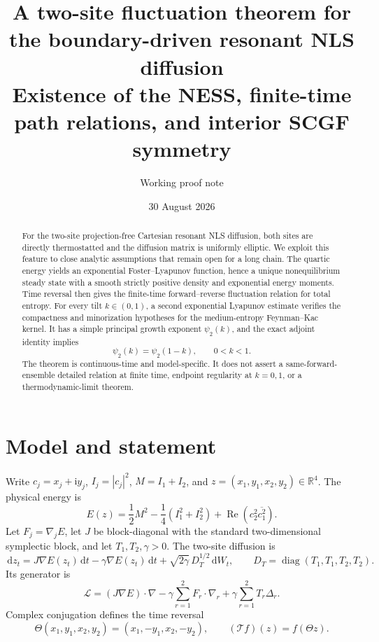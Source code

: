 \documentclass[11pt]{article}
\title{A two-site fluctuation theorem for the boundary-driven resonant NLS diffusion\\
\large Existence of the NESS, finite-time path relations, and interior SCGF symmetry}
\author{Working proof note}
\date{30 August 2026}
\theoremstyle{remark}
\newcommand{\R}{\mathbb R}
\newcommand{\dd}{\,\mathrm d}
\newcommand{\cL}{\mathcal L}
\newcommand{\Thetaop}{\mathcal T}
\begin{document}
\maketitle

\begin{abstract}
For the two-site projection-free Cartesian resonant NLS diffusion, both sites
are directly thermostatted and the diffusion matrix is uniformly elliptic.
We exploit this feature to close analytic assumptions that remain open for a
long chain.  The quartic energy yields an exponential Foster--Lyapunov
function, hence a unique nonequilibrium steady state with a smooth strictly
positive density and exponential energy moments.  Time reversal then gives
the finite-time forward--reverse fluctuation relation for total entropy.  For
every tilt $k\in(0,1)$, a second exponential Lyapunov estimate verifies the
compactness and minorization hypotheses for the medium-entropy
Feynman--Kac kernel.  It has a simple principal growth exponent
$\psi_2(k)$, and the exact adjoint identity implies
\[
  \psi_2(k)=\psi_2(1-k),\qquad 0<k<1.
\]
The theorem is continuous-time and model-specific.  It does not assert a
same-forward-ensemble detailed relation at finite time, endpoint regularity
at $k=0,1$, or a thermodynamic-limit theorem.
\end{abstract}

\section{Model and statement}

Write $c_j=x_j+\mathrm i y_j$, $I_j=|c_j|^2$, $M=I_1+I_2$, and
$z=(x_1,y_1,x_2,y_2)\in\R^4$.  The physical energy is
\begin{equation}\label{eq:E}
 E(z)=\frac12M^2-\frac14(I_1^2+I_2^2)
 +\operatorname{Re}(c_2^2\overline{c_1^2}).
\end{equation}
Let $F_j=\nabla_jE$, let $J$ be block-diagonal with the standard
two-dimensional symplectic block, and let $T_1,T_2,\gamma>0$.  The two-site
diffusion is
\begin{equation}\label{eq:SDE}
 \dd z_t=J\nabla E(z_t)\dd t-\gamma\nabla E(z_t)\dd t
 +\sqrt{2\gamma}\,D_T^{1/2}\dd W_t,
 \qquad D_T=\operatorname{diag}(T_1,T_1,T_2,T_2).
\end{equation}
Its generator is
\begin{equation}\label{eq:L}
 \cL=(J\nabla E)\cdot\nabla
 -\gamma\sum_{r=1}^2F_r\cdot\nabla_r
 +\gamma\sum_{r=1}^2T_r\Delta_r.
\end{equation}
Complex conjugation defines the time reversal
\[
 \Theta(x_1,y_1,x_2,y_2)=(x_1,-y_1,x_2,-y_2),
 \qquad (\Thetaop f)(z)=f(\Theta z).
\]
\end{document}
